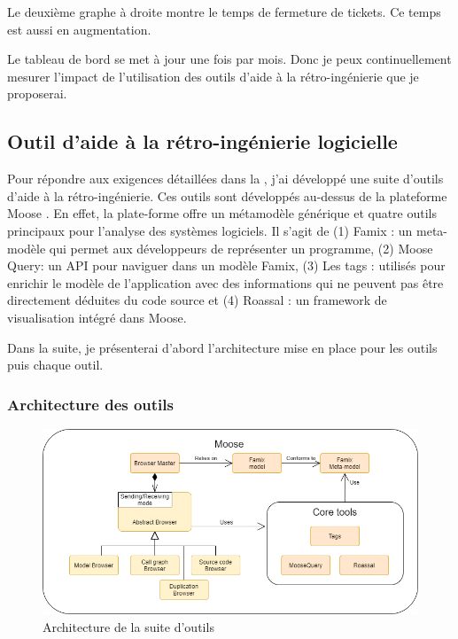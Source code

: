 \documentclass[a4paper]{article}
\begin{document}
Le deuxième graphe à droite montre le temps de fermeture de tickets. Ce temps est aussi en augmentation. 

Le tableau de bord se met à jour une fois par mois.
Donc je peux continuellement mesurer l'impact de l'utilisation des outils d'aide à la rétro-ingénierie que je proposerai.



\subsection{Outil d'aide à la rétro-ingénierie logicielle}

Pour répondre aux exigences détaillées dans la  , j'ai développé une suite d'outils d'aide à la rétro-ingénierie.
Ces outils sont développés au-dessus de la plateforme Moose \cite{Nier05c}.
En effet, la plate-forme offre un métamodèle générique et quatre outils principaux pour l'analyse des systèmes logiciels.
Il s'agit de (1) Famix : un meta-modèle qui permet aux développeurs de représenter un programme, (2) Moose Query: un API pour naviguer dans un modèle Famix,
(3) Les tags : utilisés pour enrichir le modèle de l'application avec des informations qui ne peuvent pas être directement déduites du code source et 
(4) Roassal : un framework de visualisation intégré dans Moose.

Dans la suite, je présenterai d'abord l'architecture mise en place pour les outils puis chaque outil.

\subsubsection{Architecture des outils }
\begin{figure}[htbp]
  \begin{center}
  \includegraphics[width=0.8\linewidth]{./figures/architecture.png}
  \caption{Architecture de la suite d'outils}
  \label{fig:applicationArchitecture}
  \end{center}
  \vspace{-0.3cm}
\end{figure}
\end{document}
